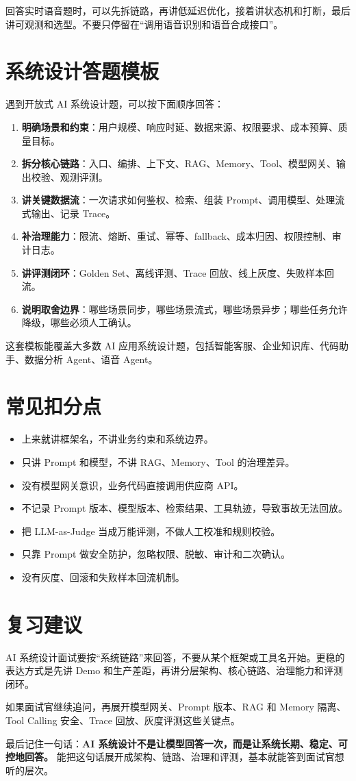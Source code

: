 \documentclass[10pt,a4paper]{ctexart}
\begin{document}
回答实时语音题时，可以先拆链路，再讲低延迟优化，接着讲状态机和打断，最后讲可观测和选型。不要只停留在“调用语音识别和语音合成接口”。



\section{系统设计答题模板}


遇到开放式 AI 系统设计题，可以按下面顺序回答：


\begin{enumerate}[itemsep=2pt, topsep=4pt]
  \item \textbf{明确场景和约束}：用户规模、响应时延、数据来源、权限要求、成本预算、质量目标。
  \item \textbf{拆分核心链路}：入口、编排、上下文、RAG、Memory、Tool、模型网关、输出校验、观测评测。
  \item \textbf{讲关键数据流}：一次请求如何鉴权、检索、组装 Prompt、调用模型、处理流式输出、记录 Trace。
  \item \textbf{补治理能力}：限流、熔断、重试、幂等、fallback、成本归因、权限控制、审计日志。
  \item \textbf{讲评测闭环}：Golden Set、离线评测、Trace 回放、线上灰度、失败样本回流。
  \item \textbf{说明取舍边界}：哪些场景同步，哪些场景流式，哪些场景异步；哪些任务允许降级，哪些必须人工确认。
\end{enumerate}


这套模板能覆盖大多数 AI 应用系统设计题，包括智能客服、企业知识库、代码助手、数据分析 Agent、语音 Agent。



\section{常见扣分点}

\begin{itemize}[itemsep=2pt, topsep=4pt]
  \item 上来就讲框架名，不讲业务约束和系统边界。
  \item 只讲 Prompt 和模型，不讲 RAG、Memory、Tool 的治理差异。
  \item 没有模型网关意识，业务代码直接调用供应商 API。
  \item 不记录 Prompt 版本、模型版本、检索结果、工具轨迹，导致事故无法回放。
  \item 把 LLM-as-Judge 当成万能评测，不做人工校准和规则校验。
  \item 只靠 Prompt 做安全防护，忽略权限、脱敏、审计和二次确认。
  \item 没有灰度、回滚和失败样本回流机制。
\end{itemize}


\section{复习建议}


AI 系统设计面试要按“系统链路”来回答，不要从某个框架或工具名开始。更稳的表达方式是先讲 Demo 和生产差距，再讲分层架构、核心链路、治理能力和评测闭环。



如果面试官继续追问，再展开模型网关、Prompt 版本、RAG 和 Memory 隔离、Tool Calling 安全、Trace 回放、灰度评测这些关键点。



最后记住一句话：\textbf{AI 系统设计不是让模型回答一次，而是让系统长期、稳定、可控地回答。} 能把这句话展开成架构、链路、治理和评测，基本就能答到面试官想听的层次。
\end{document}

